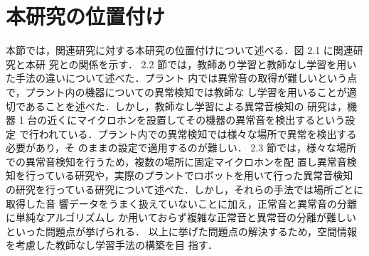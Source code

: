 \documentclass[../main]{subfiles}
\begin{document}
\section{本研究の位置付け}
\label{sec:intro_my_purpose}
本節では，関連研究に対する本研究の位置付けについて述べる．図 2.1 に関連研究と本研
究との関係を示す．
2.2 節では，教師あり学習と教師なし学習を用いた手法の違いについて述べた．プラント
内では異常音の取得が難しいという点で，プラント内の機器についての異常検知では教師な
し学習を用いることが適切であることを述べた．しかし，教師なし学習による異常音検知の
研究は，機器 1 台の近くにマイクロホンを設置してその機器の異常音を検出するという設定
で行われている．プラント内での異常検知では様々な場所で異常を検出する必要があり，そ
のままの設定で適用するのが難しい．
2.3 節では，様々な場所での異常音検知を行うため，複数の場所に固定マイクロホンを配
置し異常音検知を行っている研究や，実際のプラントでロボットを用いて行った異常音検知
の研究を行っている研究について述べた．しかし，それらの手法では場所ごとに取得した音
響データをうまく扱えていないことに加え，正常音と異常音の分離に単純なアルゴリズムし
か用いておらず複雑な正常音と異常音の分離が難しいといった問題点が挙げられる．
以上に挙げた問題点の解決するため，空間情報を考慮した教師なし学習手法の構築を目
指す．
\end{document}
